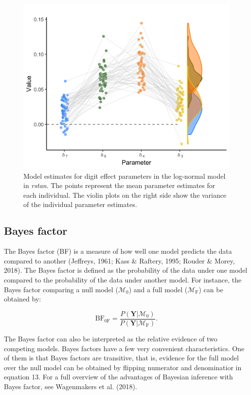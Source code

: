 \documentclass[
  english,
  doc,floatsintext]{apa6}
\begin{document}
\begin{figure}[H]

\includegraphics[width=0.75\linewidth]{Images/Fig15_inddiflogplot_onlyrstan_v2} \hfill{}

\caption{Model estimates for digit effect parameters in the log-normal model in \textit{rstan}. The points represent the mean parameter estimates for each individual. The violin plots on the right side show the variance of the individual parameter estimates.}\label{fig:modeldigitestplotlog}
\end{figure}

\hypertarget{bayes-factor}{%
\subsection{Bayes factor}\label{bayes-factor}}

The Bayes factor (BF) is a measure of how well one model predicts the data compared to another (Jeffreys, 1961; Kass \& Raftery, 1995; Rouder \& Morey, 2018). The Bayes factor is defined as the probability of the data under one model compared to the probability of the data under another model. For instance, the Bayes factor comparing a null model (\(\mathcal{M}_0\)) and a full model (\(\mathcal{M}_{\text{F}}\)) can be obtained by:

\begin{equation}
\text{BF}_{0\text{F}} = \frac{P(\bm{Y} | \mathcal{M}_0)}{P(\bm{Y} | \mathcal{M}_{\text{F}})}. 
\end{equation}

The Bayes factor can also be interpreted as the relative evidence of two competing models. Bayes factors have a few very convenient characteristics. One of them is that Bayes factors are transitive, that is, evidence for the full model over the null model can be obtained by flipping numerator and denominatior in equation 13. For a full overview of the advantages of Bayesian inference with Bayes factor, see Wagenmakers et al. (2018).
\end{document}
